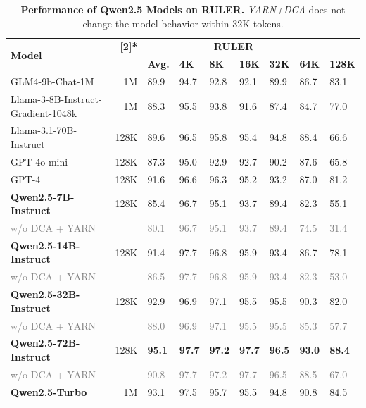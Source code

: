\begin{table}[tbp]
\centering
\caption{\textbf{Performance of Qwen2.5 Models on RULER.} \textit{YARN+DCA} does not change the model behavior within 32K tokens.}
\label{tab:ruler}
\small
\begin{tabular}{@{}lrlllllll@{}}
\toprule
\multirow{2}{*}{\bf Model} & \bf \multirow{2}[2]{*}{\makecell{\bf Claimed \\ Length}} & \multicolumn{6}{c}{\bf RULER}  \\ 
\cmidrule{3-9}
 & &  \bf Avg.  & \bf 4K   & \bf 8K    & \bf 16K  & \bf 32K  & \bf 64K   & \bf 128K  \\ \midrule
 GLM4-9b-Chat-1M & 1M         & 89.9   & 94.7   & 92.8            & 92.1   & 89.9   & 86.7          & 83.1             \\
Llama-3-8B-Instruct-Gradient-1048k & 1M         & 88.3   & 95.5   & 93.8            & 91.6   & 87.4   & 84.7          & 77.0      \\
Llama-3.1-70B-Instruct & 128K & 89.6 & 96.5 & 95.8 &  95.4 & 94.8  & 88.4 &  66.6 \\
GPT-4o-mini    & 128K       & 87.3   & 95.0   & 92.9            & 92.7   & 90.2   & 87.6          & 65.8                \\ 
GPT-4        & 128K     & 91.6 & 96.6 & 96.3 & 95.2 & 93.2 & 87.0          & 81.2              \\ 
\midrule
\textbf{Qwen2.5-7B-Instruct}  & 128K & 85.4 & 96.7 & 95.1 &93.7 & 89.4&82.3&55.1\\
\textcolor{gray}{\quad w/o DCA + YARN} &  & \textcolor{gray}{80.1} & \textcolor{gray}{96.7} & \textcolor{gray}{95.1} & \textcolor{gray}{93.7} & \textcolor{gray}{89.4} &\textcolor{gray}{74.5}&\textcolor{gray}{31.4} \\
\textbf{Qwen2.5-14B-Instruct} & 128K & 91.4 &97.7 &96.8 &95.9 &93.4 & 86.7 & 78.1 \\
\quad \textcolor{gray}{w/o DCA + YARN} &  & \textcolor{gray}{86.5} & \textcolor{gray}{97.7} & \textcolor{gray}{96.8} & \textcolor{gray}{95.9} & \textcolor{gray}{93.4} & \textcolor{gray}{82.3} & \textcolor{gray}{53.0} \\
\textbf{Qwen2.5-32B-Instruct} & 128K & 92.9 & 96.9 & 97.1 & 95.5 & 95.5 & 90.3 & 82.0  \\
\quad \textcolor{gray}{w/o DCA + YARN} &  & \textcolor{gray}{88.0} & \textcolor{gray}{96.9} & \textcolor{gray}{97.1} & \textcolor{gray}{95.5} & \textcolor{gray}{95.5} & \textcolor{gray}{85.3} & \textcolor{gray}{57.7} \\
\textbf{Qwen2.5-72B-Instruct} & 128K & \bf95.1 & \bf97.7 & \bf 97.2 & \bf 97.7 & \bf 96.5 & \bf 93.0 & \bf 88.4 \\
\quad \textcolor{gray}{w/o DCA + YARN} &  & \textcolor{gray}{90.8} & \textcolor{gray}{97.7} & \textcolor{gray}{97.2} & \textcolor{gray}{97.7} & \textcolor{gray}{96.5} &  \textcolor{gray}{88.5} & \textcolor{gray}{67.0} \\
\midrule
\textbf{Qwen2.5-Turbo}  & 1M & {93.1} & {97.5} & 95.7 & {95.5} & {94.8} & {90.8} & {84.5} \\                 
\bottomrule
\end{tabular}
\end{table}


